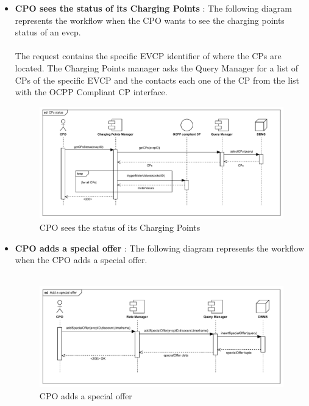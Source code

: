 \begin{itemize}
    \item \textbf{CPO sees the status of its Charging Points} : The following diagram represents the workflow when the CPO wants to see the charging points status of an evcp.\\
          \\ The request contains the specific EVCP identifier of where the CPs are located. The Charging Points manager asks the Query Manager for a list of CPs of the specific EVCP
          and the contacts each one of the CP from the list with the OCPP Compliant CP interface.
          \pagebreak
          \begin{figure}[H]
              \centering
              \includegraphics[scale=0.55]{src/runtimeView/CPMS_CPsStatus.pdf}
              \caption{CPO sees the status of its Charging Points}
          \end{figure}
    \item \textbf{CPO adds a special offer} : The following diagram represents the workflow when the CPO adds a special offer.\\
          \\
          \begin{figure}[H]
              \centering
              \includegraphics[scale=0.55]{src/runtimeView/CPMS_specialOffer.pdf}
              \caption{CPO adds a special offer}
          \end{figure}

\end{itemize}
